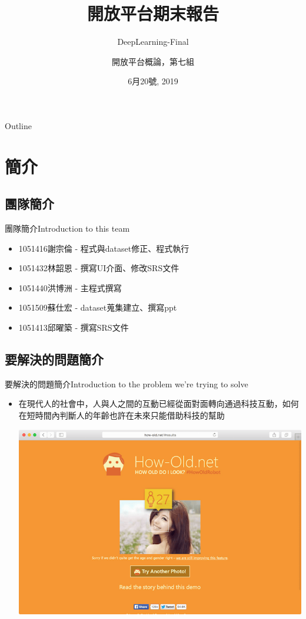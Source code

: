 \documentclass[utf8x]{beamer}
\title{開放平台期末報告}
\subtitle{DeepLearning-Final}
\author{開放平台概論，第七組}
\date{6月20號, 2019}
\begin{document}
\begin{frame}
  \titlepage
\end{frame}

\begin{frame}[shrink]{Outline}
  \tableofcontents
\end{frame}

\section{簡介}

\subsection{團隊簡介}

\begin{frame}{團隊簡介}{Introduction to this team }
  \begin{itemize}
  \item {
    1051416謝宗倫 - 程式與dataset修正、程式執行
  }
  \item {
    1051432林韶恩 - 撰寫UI介面、修改SRS文件
  }
 \item {
    1051440洪博洲 - 主程式撰寫
  }
 \item {
    1051509蘇仕宏 - dataset蒐集建立、撰寫ppt
  }
 \item {
   1051413邱曜築 - 撰寫SRS文件
  }
  \end{itemize}
\end{frame}

\subsection{要解決的問題簡介}
\begin{frame}{要解決的問題簡介}{Introduction to the problem we're trying to solve}
  \begin{itemize}
  \item {
    在現代人的社會中，人與人之間的互動已經從面對面轉向通過科技互動，如何在短時間內判斷人的年齡也許在未來只能借助科技的幫助
\begin{minipage}[c][0.4\textheight][c]{\linewidth}
                \centering
                \includegraphics[width=0.5\linewidth]{how.png}
            \end{minipage}
  }
  \end{itemize}
\end{frame}
\end{document}

